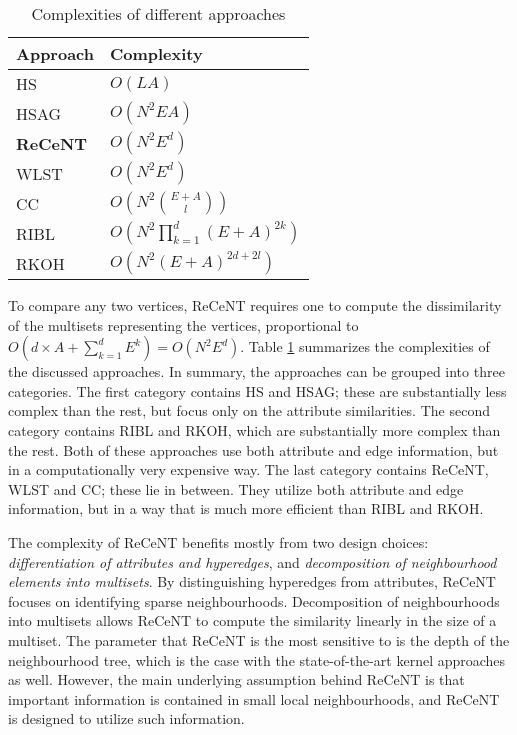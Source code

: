 \begin{table}
    \centering
    \caption{Complexities of different approaches}
    \label{tab:complexities}
    \begin{tabular}{@{}ll@{}}
        \toprule
        \textbf{Approach} & \textbf{Complexity} \\
        \midrule        
        HS    & $O\left (  LA \right )$       \\
        
         HSAG  & $O \left ( N^2EA \right)$     \\
        
        \textbf{ReCeNT}  & $O \left ( N^2  E^d  \right )$ \\       
        
         WLST  & $O \left( N^2 E^d \right ) $  \\
        
        CC    & $O \left( N^2   {{E + A}\choose{l}} \right)$  \\
        
        RIBL  & $O \left(  N^2 \prod_{k=1}^{d}(E + A)^{2k} \right) $  \\
        
         RKOH  & $O \left(  N^2 \left( E + A \right)^{2d + 2l} \right)$ \\
        \bottomrule
    \end{tabular}
    
\end{table}



To compare any two vertices, ReCeNT requires one to compute the dissimilarity of the multisets representing the vertices, proportional to $O(d\times A + \sum_{k=1}^d E^k) = O\left (N^2 E^d \right )$.
Table \ref{tab:complexities} summarizes the complexities of the discussed approaches.
In summary, the approaches can be grouped into three categories.
The first category contains HS and HSAG; these are substantially less complex than the rest, but focus only on the attribute similarities.
The second category contains RIBL and RKOH, which are substantially more complex than the rest.
Both of these approaches use both attribute and edge information, but in a computationally very expensive way.
The last category contains ReCeNT, WLST and CC; these lie in between. They utilize both attribute and edge information, but in a way that is much more efficient than RIBL and RKOH.




The complexity of ReCeNT benefits mostly from two design choices: \textit{differentiation of attributes and hyperedges}, and \textit{decomposition of neighbourhood elements into multisets}.
By distinguishing hyperedges from attributes, ReCeNT focuses on identifying sparse neighbourhoods.  
Decomposition of neighbourhoods into multisets allows ReCeNT to compute the similarity linearly in the size of a multiset. 
The parameter that ReCeNT is the most sensitive to is the depth of the neighbourhood tree, which is the case with the state-of-the-art kernel approaches as well.
However, the main underlying assumption behind ReCeNT is that important information is contained in small local neighbourhoods, and ReCeNT is designed to utilize such information.


